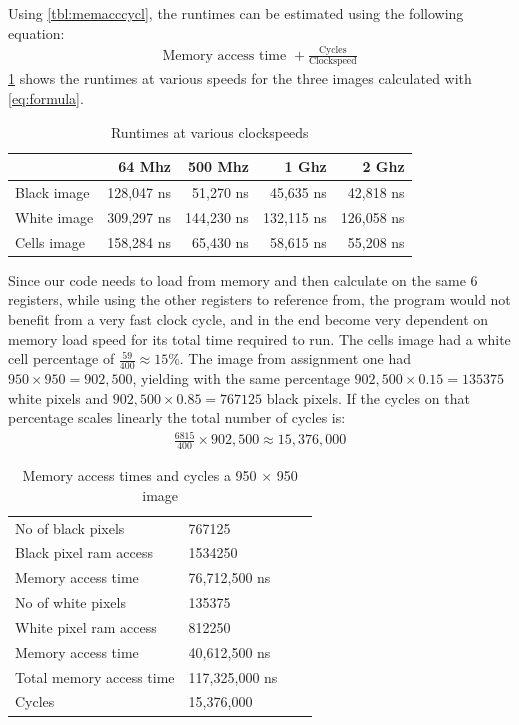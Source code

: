 \documentclass[a4paper, english]{article}
\numberwithin{equation}{section}
\begin{document}
Using \cref{tbl:memacccycl}, the runtimes can be estimated using the following equation:
\begin{align}
    \text{Memory access time } + \frac{\text{Cycles}}{\text{Clockspeed}}\label{eq:formula}
\end{align}
\cref{tbl:GHZ} shows the runtimes at various speeds for the three images calculated with \cref{eq:formula}.
\begin{table}[H]
\centering
\caption{Runtimes at various clockspeeds}\label{tbl:GHZ}
\begin{tabular}{lrrrr}
\toprule
&64 Mhz & 500 Mhz & 1 Ghz & 2 Ghz \\
\midrule
Black image & 128,047 ns & 51,270 ns & 45,635 ns & 42,818 ns \\
White image & 309,297 ns & 144,230 ns & 132,115 ns & 126,058 ns \\
Cells image & 158,284 ns & 65,430 ns & 58,615 ns & 55,208 ns \\
\bottomrule
\end{tabular}
\end{table}
Since our code needs to load from memory and then calculate on the same 6 registers, while using the other registers to reference from, the program would not benefit from a very fast clock cycle, and in the end become very dependent on memory load speed for its total time required to run.\newline
The cells image had a white cell percentage of \(\frac{59}{400} \approx 15 \%\). The image from assignment one had \(950 \times 950 = 902,500\), yielding with the same percentage \(902,500 \times 0.15 = 135375\) white pixels and \(902,500 \times 0.85 = 767125\) black pixels. If the cycles on that percentage scales linearly the total number of cycles is:
\begin{align}
    \frac{6815}{400} \times 902,500 \approx 15,376,000
\end{align}
\begin{table}[H]
\centering
\caption{Memory access times and cycles a 950 \(\times\) 950 image}\label{tbl:950}
\begin{tabular}{llll}
\toprule
 No of black pixels &767125 \\
 Black pixel ram access & 1534250\\
 Memory access time &  76,712,500 ns\\
 \midrule
 No of white pixels &135375\\
 White pixel ram access & 812250 \\
 Memory access time &40,612,500 ns\\
 \midrule
 Total memory access time & 117,325,000 ns\\
 Cycles & 15,376,000\\
\bottomrule
\end{tabular}
\end{table}
\end{document}
